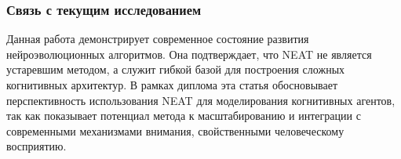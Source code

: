 \subsubsection{Связь с текущим исследованием}

Данная работа демонстрирует современное состояние развития нейроэволюционных алгоритмов. Она подтверждает, что NEAT не является устаревшим методом, а служит гибкой базой для построения сложных когнитивных архитектур. В рамках диплома эта статья обосновывает перспективность использования NEAT для моделирования когнитивных агентов, так как показывает потенциал метода к масштабированию и интеграции с современными механизмами внимания, свойственными человеческому восприятию.